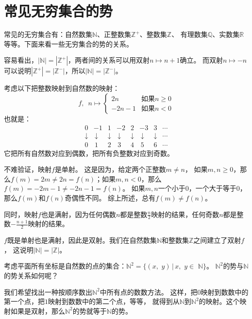 \documentclass[12pt,UTF8,fontset=none]{ctexbook}
\begin{document}
\section{常见无穷集合的势}

常见的无穷集合有：自然数集$\mathbb{N}$、正整数集$\mathbb{Z}^+$、整数集$\mathbb{Z}$、
有理数集$\mathbb{Q}$、实数集$\mathbb{R}$等等。下面来看一些无穷集合的势的关系。

容易看出，$|\mathbb{N}| = |\mathbb{Z}^+|$，两者间的关系可以用双射$n\mapsto n + 1$确立。
而双射$n \mapsto -n$可以说明$|\mathbb{Z}^+| = |\mathbb{Z}^-|$，所以$|\mathbb{N}| = |\mathbb{Z}^-|$。

考虑以下把整数映射到自然数的映射：
$$ f,\,\,\,n\mapsto \left\{
    \begin{array}{cl}
        2n & \mbox{如果}n \geqslant 0 \\
        -2n - 1  & \mbox{如果}n < 0 
    \end{array}\right.
$$
也就是：
$$ \begin{array}{cccccccc}
        0 & -1 & 1 & -2 & 2 & -3 & 3 & \cdots \\
        \downarrow & \,\downarrow & \downarrow & \,\downarrow & \downarrow & \,\downarrow & \downarrow & \cdots \\
        0 & \,1 & 2 & \,3 & 4 & \,5 & 6 & \cdots 
    \end{array}
$$
它把所有自然数对应到偶数，把所有负整数对应到奇数。

不难验证，映射$f$是单射。
这是因为，给定两个正整数$m \neq n$，
如果$m,n\geqslant 0$，那么$f(m) = 2m \neq 2n = f(n)$；如果$m,n< 0$，那么$f(m) = -2m - 1 \neq -2n - 1 = f(n)$。
如果$m,n$一个小于$0$，一个大于等于$0$，那么$f(m)$和$f(n)$奇偶性不同。
综上所述，总有$f(m) \neq f(n)$。

同时，映射$f$也是满射，因为任何偶数$n$都是整数$\frac{n}{2}$映射的结果，任何奇数$n$都是整数$-\frac{n+1}{2}$映射的结果。

$f$既是单射也是满射，因此是双射。我们在自然数集$\mathbb{N}$和整数集$\mathbb{Z}$之间建立了双射$f$，
这说明$|\mathbb{N}| = |\mathbb{Z}|$。

考虑平面所有坐标是自然数的点的集合：$\mathbb{N}^2 = \{(x,\,\,y) \, | \, x, \,\, y \in \,\, \mathbb{N}\}$。
$\mathbb{N}^2$的势与$\mathbb{N}$的势关系如何呢？

我们希望找出一种按顺序数出$\mathbb{N}^2$中所有点的数数方法。
这样，把$0$映射到数数中的第一个点，把$1$映射到数数中的第二个点，等等，
就得到从$\mathbb{N}$到$\mathbb{N}^2$的映射。这个映射如果是双射，那么$\mathbb{N}^2$的势就等于$\mathbb{N}$的势。
\end{document}
